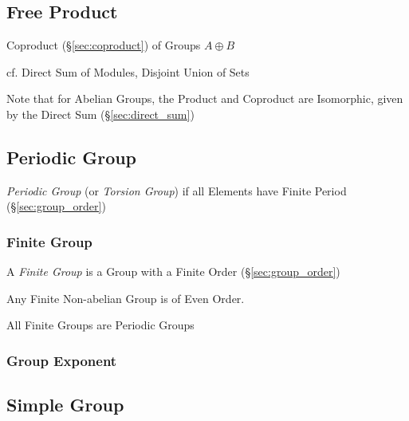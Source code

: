 \subsection{Free Product}\label{sec:free_product}

Coproduct (\S\ref{sec:coproduct}) of Groups $A \oplus B$

cf. Direct Sum of Modules, Disjoint Union of Sets

\HandRight\; Note that for Abelian Groups, the Product and Coproduct
are Isomorphic, given by the Direct Sum (\S\ref{sec:direct_sum})



\subsection{Periodic Group}\label{sec:periodic_group}

\emph{Periodic Group} (or \emph{Torsion Group}) if all Elements have
Finite Period (\S\ref{sec:group_order})



\subsubsection{Finite Group}\label{sec:finite_group}

A \emph{Finite Group} is a Group with a Finite Order
(\S\ref{sec:group_order})

Any Finite Non-abelian Group is of Even Order.

All Finite Groups are Periodic Groups



\subsubsection{Group Exponent}\label{sec:group_exponent}



\subsection{Simple Group}\label{sec:simple_group}

